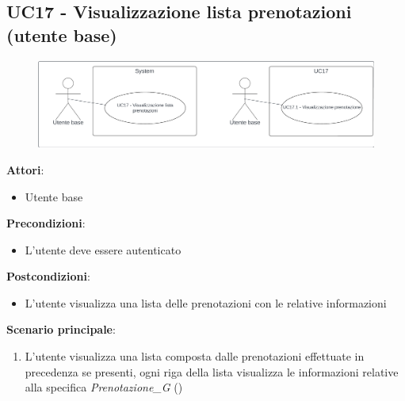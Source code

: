 \subsection{UC17 - Visualizzazione lista prenotazioni (utente base)} \label{usecase:17}
\begin{figure}[H]
  \centering
  \includegraphics[width=1\textwidth]{ucd/UCD17.png}
\end{figure}
\textbf{Attori}:
\begin{itemize}
    \item Utente base
\end{itemize}
\textbf{Precondizioni}:
\begin{itemize}
    \item L'utente deve essere autenticato
\end{itemize}
\textbf{Postcondizioni}:
\begin{itemize}
    \item L'utente visualizza una lista delle prenotazioni con le relative informazioni
\end{itemize}
\textbf{Scenario principale}:
\begin{enumerate}
    \item L'utente visualizza una lista composta dalle prenotazioni effettuate in precedenza se presenti, ogni riga della lista visualizza le informazioni relative alla specifica \textit{Prenotazione_G} ()
\end{enumerate}

